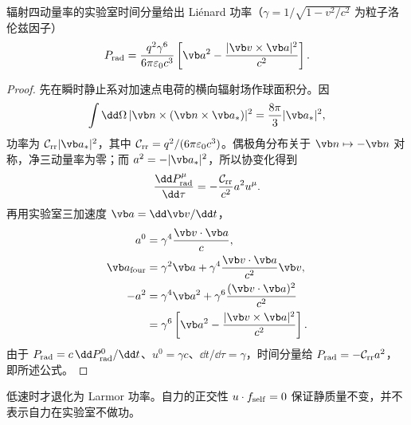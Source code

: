 \begin{proposition}
辐射四动量率的实验室时间分量给出 Liénard 功率（\(\gamma=1/\sqrt{1-v^2/c^2}\) 为粒子洛伦兹因子）
\begin{equation}
 P_{\rm rad}
 =\frac{q^2\gamma^6}{6\pi\varepsilon_0c^3}
 \left[\vb a^2-\frac{|\vb v\times\vb a|^2}{c^2}\right].
 \label{eq:phys-rr-lienard-power}
\end{equation}
\end{proposition}
\begin{proof}
先在瞬时静止系对加速点电荷的横向辐射场作球面积分。因
\[
 \int\dd\Omega\,|\vb n\times(\vb n\times\vb a_*)|^2
 =\frac{8\pi}{3}|\vb a_*|^2,
\]
功率为 $\mathcal C_{\rm rr}|\vb a_*|^2$，其中 $\mathcal C_{\rm rr}=q^2/(6\pi\varepsilon_0c^3)$。偶极角分布关于 $\vb n\mapsto-\vb n$ 对称，净三动量率为零；而 $a^2=-|\vb a_*|^2$，所以协变化得到
\[
 \frac{\dd P_{\rm rad}^\mu}{\dd\tau}=-\frac{\mathcal C_{\rm rr}}{c^2}a^2u^\mu.
\]
再用实验室三加速度 $\vb a=\dd\vb v/\dd t$，
\begin{align*}
 a^0&=\gamma^4\frac{\vb v\cdot\vb a}{c},\\
 \vb a_{\rm four}&=\gamma^2\vb a+\gamma^4\frac{\vb v\cdot\vb a}{c^2}\vb v,\\
 -a^2&=\gamma^4\vb a^2+\gamma^6\frac{(\vb v\cdot\vb a)^2}{c^2}\\
 &=\gamma^6\left[\vb a^2-\frac{|\vb v\times\vb a|^2}{c^2}\right].
\end{align*}
由于 $P_{\rm rad}=c\,\dd P_{\rm rad}^0/\dd t$、$u^0=\gamma c$、$\dd t/\dd\tau=\gamma$，时间分量给 $P_{\rm rad}=-\mathcal C_{\rm rr}a^2$，即所述公式。
\end{proof}
低速时才退化为 Larmor 功率。自力的正交性 $u\cdot f_{\rm self}=0$ 保证静质量不变，并不表示自力在实验室不做功。

